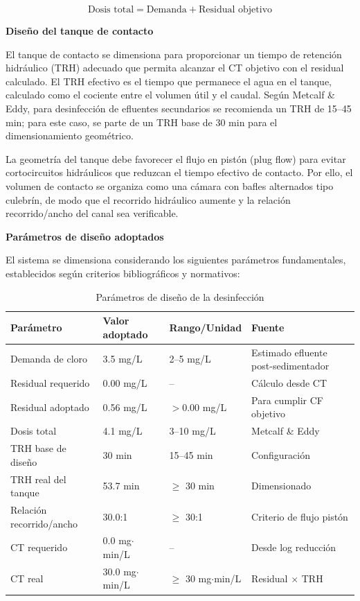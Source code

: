 \documentclass[12pt,a4paper]{article}
\begin{document}
\begin{equation}
\text{Dosis total} = \text{Demanda} + \text{Residual objetivo}
\end{equation}

\textbf{Diseño del tanque de contacto}

El tanque de contacto se dimensiona para proporcionar un tiempo de retención hidráulico (TRH) adecuado que permita alcanzar el CT objetivo con el residual calculado. El TRH efectivo es el tiempo que permanece el agua en el tanque, calculado como el cociente entre el volumen útil y el caudal. Según Metcalf \& Eddy, para desinfección de efluentes secundarios se recomienda un TRH de 15--45 min; para este caso, se parte de un TRH base de 30 min para el dimensionamiento geométrico.

La geometría del tanque debe favorecer el flujo en pistón (plug flow) para evitar cortocircuitos hidráulicos que reduzcan el tiempo efectivo de contacto. Por ello, el volumen de contacto se organiza como una cámara con bafles alternados tipo culebrín, de modo que el recorrido hidráulico aumente y la relación recorrido/ancho del canal sea verificable.

\textbf{Parámetros de diseño adoptados}

El sistema se dimensiona considerando los siguientes parámetros fundamentales, establecidos según criterios bibliográficos y normativos:

\begin{table}[H]
\centering
\caption{Parámetros de diseño de la desinfección}
\small
\begin{tabular}{@{}p{}p{}p{}p{}@{}}
\toprule
\textbf{Parámetro} & \textbf{Valor adoptado} & \textbf{Rango/Unidad} & \textbf{Fuente} \\
\midrule
Demanda de cloro & 3.5 mg/L & 2--5 mg/L & Estimado efluente post-sedimentador \\
Residual requerido & 0.00 mg/L & -- & Cálculo desde CT \\
Residual adoptado & 0.56 mg/L & $>$0.00 mg/L & Para cumplir CF objetivo \\
Dosis total & 4.1 mg/L & 3--10 mg/L & Metcalf \& Eddy \cite{metcalf2014} \\
TRH base de diseño & 30 min & 15--45 min & Configuración \\
TRH real del tanque & 53.7 min & $\geq$ 30 min & Dimensionado \\
Relación recorrido/ancho & 30.0:1 & $\geq$ 30:1 & Criterio de flujo pistón \\
CT requerido & 0.0 mg$\cdot$min/L & -- & Desde log reducción \\
CT real & 30.0 mg$\cdot$min/L & $\geq$ 30 mg$\cdot$min/L & Residual $\times$ TRH \\
\bottomrule
\end{tabular}
\end{table}
\end{document}
